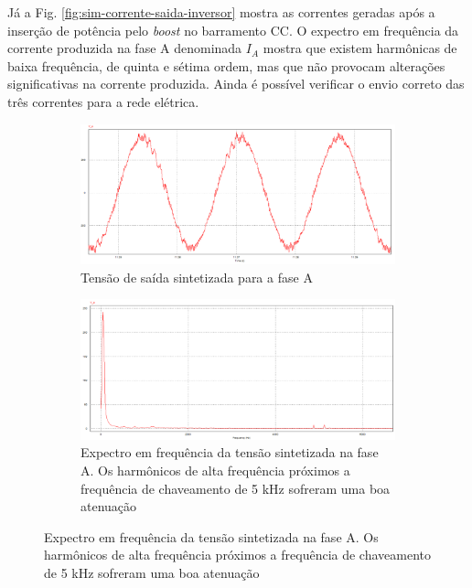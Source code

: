 Já a Fig. \ref{fig:sim-corrente-saida-inversor} mostra as correntes geradas após a inserção de potência pelo \textit{boost} no barramento CC.
O expectro em frequência da corrente produzida na fase A denominada $I_A$ mostra que existem harmônicas de baixa frequência, de quinta e sétima ordem, mas que não provocam alterações significativas na corrente produzida.
Ainda é possível verificar o envio correto das três correntes para a rede elétrica.

\begin{figure}[!hbt]
	\centering
	\begin{subfigure}[b]{0.5\textwidth}
		\centering
		\includegraphics[width=\textwidth]{figuras/sim_figures/sistema_completo/tensao_saida_inversor_2.PNG}
		\caption{Tensão de saída sintetizada para a fase A}
   \end{subfigure}

   \begin{subfigure}[b]{0.5\textwidth}
		\centering
		\includegraphics[width=\textwidth]{figuras/sim_figures/sistema_completo/tensao_saida_inversor_fft.PNG}
		\caption{Expectro em frequência da tensão sintetizada na fase A. Os harmônicos de alta frequência próximos a frequência de chaveamento de 5 kHz sofreram uma boa atenuação}
   \end{subfigure}


\end{figure}
